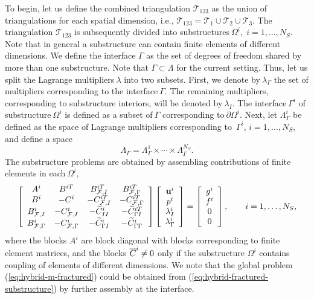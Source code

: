 To begin, let us define the combined triangulation $\mathcal{T}_{123}$ as the
union of triangulations for each spatial dimension, i.e., $\mathcal{T}%
_{123}=\mathcal{T}_{1}\cup\mathcal{T}_{2}\cup\mathcal{T}_{3}$. The
triangulation $\mathcal{T}_{123}$ is subsequently divided into
substructures$~\Omega^{i},\;i=1,\dots,N_{S}$. Note that in general a
substructure can contain finite elements of different dimensions. We
define the interface $\Gamma$ as the set of degrees of freedom shared by more
than one substructure. 
Note that $\Gamma \subset \Lambda$ for the current setting.
Thus, let us split the Lagrange multipliers$~\lambda$ into
two subsets. First, we denote by$~\lambda_{\Gamma}$ the set of multipliers
corresponding to the interface$~\Gamma$. The remaining multipliers,
corresponding to substructure interiors, will be denoted by$~\lambda_{I}$. The
interface$~\Gamma^{i}$ of substructure$~\Omega^{i}$ is defined as a subset
of$~\Gamma$ corresponding to$~\partial\Omega^{i}$. Next, let $\Lambda_{\Gamma
}^{i}$ be defined as the space of Lagrange multipliers corresponding
to~$\Gamma^{i}$, $i=1,\ldots,N_{S}$, and define a space
\begin{equation}
\Lambda_{\Gamma}=\Lambda_{\Gamma}^{1}\times\cdots\times\Lambda_{\Gamma}%
^{N_{S}}.
\end{equation}
The substructure problems are obtained by assembling contributions of finite
elements in each$~\Omega^{i}$,%
\begin{equation}
\left[
\begin{array}
[c]{cccc}%
A^{i} & B^{iT} & B_{\mathcal{F},I}^{iT} & B_{\mathcal{F},\Gamma}^{iT}\\
B^{i} & -C^{i} & -C_{\mathcal{F},I}^{iT} & -C_{\mathcal{F},\Gamma
}^{iT}\\
B_{\mathcal{F},I}^{i} & -C_{\mathcal{F},I}^{i} & -\widetilde{C}_{II}^{i} &
-\widetilde{C}_{{\Gamma}I}^{iT}\\
B_{\mathcal{F},\Gamma}^{i} & -C_{\mathcal{F},\Gamma}^{i} & -\widetilde{C}%
_{{\Gamma}I}^{i} & -\widetilde{C}_{{\Gamma}{\Gamma}}^{i}%
\end{array}
\right]  \left[
\begin{array}
[c]{c}%
\mathbf{u}^{i}\\
p^{i}\\
\lambda_{I}^{i}\\
\lambda_{\Gamma}^{i}%
\end{array}
\right]  =\left[
\begin{array}
[c]{c}%
g^{i}\\
f^{i}\\
0\\
0
\end{array}
\right]  ,\qquad i=1,\dots,N_{S}, \label{eq:hybrid-fractured-substructure}%
\end{equation}
where the blocks $A^{i}$ are block diagonal with blocks corresponding to
finite element matrices, and the blocks $\overline{C}^{i}\neq0$ only if the
substructure $\Omega^{i}$ contains coupling of elements of different
dimensions. We note that the global problem (\ref{eq:hybrid-m-fractured}) could
be obtained from (\ref{eq:hybrid-fractured-substructure}) by further assembly at the interface.

